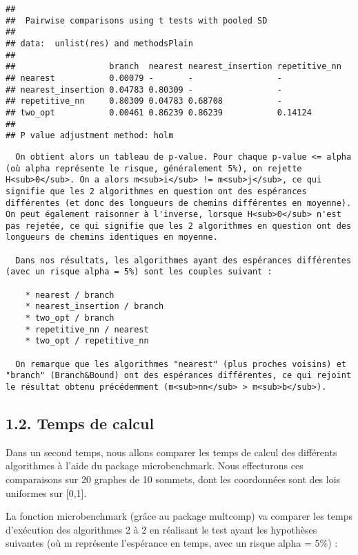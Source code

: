 \documentclass[
]{article}
\begin{document}
\begin{verbatim}
## 
##  Pairwise comparisons using t tests with pooled SD 
## 
## data:  unlist(res) and methodsPlain 
## 
##                   branch  nearest nearest_insertion repetitive_nn
## nearest           0.00079 -       -                 -            
## nearest_insertion 0.04783 0.80309 -                 -            
## repetitive_nn     0.80309 0.04783 0.68708           -            
## two_opt           0.00461 0.86239 0.86239           0.14124      
## 
## P value adjustment method: holm
\end{verbatim}

\begin{verbatim}
  On obtient alors un tableau de p-value. Pour chaque p-value <= alpha (où alpha représente le risque, généralement 5%), on rejette H<sub>0</sub>. On a alors m<sub>i</sub> != m<sub>j</sub>, ce qui signifie que les 2 algorithmes en question ont des espérances différentes (et donc des longueurs de chemins différentes en moyenne). On peut également raisonner à l'inverse, lorsque H<sub>0</sub> n'est pas rejetée, ce qui signifie que les 2 algorithmes en question ont des longueurs de chemins identiques en moyenne.

  Dans nos résultats, les algorithmes ayant des espérances différentes (avec un risque alpha = 5%) sont les couples suivant :

    * nearest / branch
    * nearest_insertion / branch
    * two_opt / branch
    * repetitive_nn / nearest
    * two_opt / repetitive_nn

  On remarque que les algorithmes "nearest" (plus proches voisins) et "branch" (Branch&Bound) ont des espérances différentes, ce qui rejoint le résultat obtenu précédemment (m<sub>nn</sub> > m<sub>b</sub>).
\end{verbatim}

\hypertarget{temps-de-calcul}{%
\subsection{1.2. Temps de calcul}\label{temps-de-calcul}}

Dans un second temps, nous allons comparer les temps de calcul des
différents algorithmes à l'aide du package microbenchmark. Nous
effecturons ces comparaisons sur 20 graphes de 10 sommets, dont les
coordonnées sont des lois uniformes sur {[}0,1{]}.

La fonction microbenchmark (grâce au package multcomp) va comparer les
temps d'exécution des algorithmes 2 à 2 en réalisant le test ayant les
hypothèses suivantes (où m représente l'espérance en temps, avec un
risque alpha = 5\%) :
\end{document}
